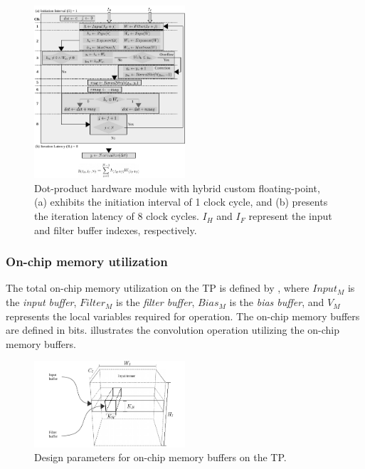 \begin{figure}[t!]
	\centering
	\includegraphics[width=0.5\textwidth]{../figures/dot_product_hybrid.pdf}
	\caption{Dot-product hardware module with hybrid custom floating-point, (a) exhibits the initiation interval of 1 clock cycle, and (b) presents
		the iteration latency of 8 clock cycles. $I_H$ and $I_F$ represent the input and filter buffer indexes, respectively.}
	\label{fig:dot_product_hybrid}
\end{figure}


\subsubsection{\textbf{On-chip memory utilization}}
The total on-chip memory utilization on the TP is defined by , where $Input_{M}$ is the \emph{input buffer}, $Filter_{M}$ is the \emph{filter buffer}, $Bias_{M}$ is the \emph{bias buffer}, and $V_{M}$ represents the local variables required for operation. The on-chip memory buffers are defined in bits.  illustrates the convolution operation utilizing the on-chip memory buffers.

\begin{figure}[h!]
	\centering
	\includegraphics[width=0.5\textwidth]{../figures/accelerator_buffers.pdf}
	\caption{Design parameters for on-chip memory buffers on the TP.}
	\label{fig:accelerator_buffers}
\end{figure}

